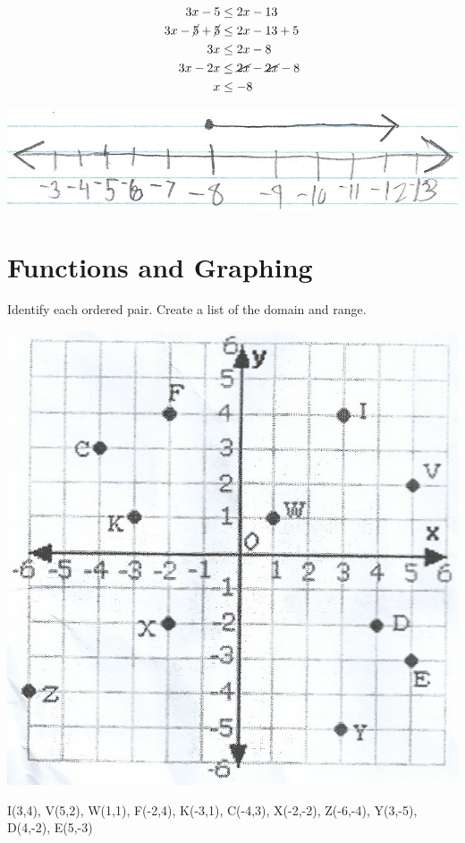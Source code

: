 \documentclass[11pt]{article} %
\begin{document}
\begin{align*}
3x - 5 &\leq 2x - 13 \\
3x - {\cancel{5}} + {\cancel{5}} &\leq 2x - 13 + 5 \\
3x &\leq 2x - 8 \\
3x - 2x &\leq {\cancel{2x}} - {\cancel{2x}} - 8 \\
x &\leq -8
\end{align*}

\includegraphics{ineq_3}

\section{Functions and Graphing}

Identify each ordered pair. Create a list of the domain and range.

\includegraphics{graph_1}

I(3,4), V(5,2), W(1,1), F(-2,4), K(-3,1), C(-4,3), X(-2,-2), Z(-6,-4), Y(3,-5), D(4,-2), E(5,-3)
\end{document}
